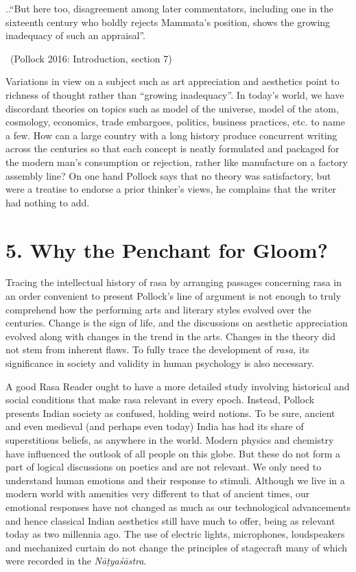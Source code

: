 
\begin{myquote}
..``But here too, disagreement among later commentators, including one in the sixteenth century who boldly rejects Mammata’s position, shows the growing inadequacy of such an appraisal”. 

~\hfill (Pollock 2016: Introduction, section 7)
\end{myquote}

Variations in view on a subject such as art appreciation and aesthetics point to richness of thought rather than “growing inadequacy”. In today’s world, we have discordant theories on topics such as model of the universe, model of the atom, cosmology, economics, trade embargoes, politics, business practices, etc. to name a few. How can a large country with a long history produce concurrent writing across the centuries so that each concept is neatly formulated and packaged for the modern man’s consumption or rejection, rather like manufacture on a factory assembly line? On one hand Pollock says that no theory was satisfactory, but were a treatise to endorse a prior thinker’s views, he complains that the writer had nothing to add.


\section*{5. Why the Penchant for Gloom?}

Tracing the intellectual history of rasa by arranging passages concerning rasa in an order convenient to present Pollock’s line of argument is not enough to truly comprehend how the performing arts and literary styles evolved over the centuries. Change is the sign of life, and the discussions on aesthetic appreciation evolved along with changes in the trend in the arts. Changes in the theory did not stem from inherent flaws. To fully trace the development of \textit{rasa,} its significance in society and validity in human psychology is also necessary.

\eject

A good Rasa Reader ought to have a more detailed study involving historical and social conditions that make rasa relevant in every epoch. Instead, Pollock presents Indian society as confused, holding weird notions. To be sure, ancient and even medieval (and perhaps even today) India has had its share of superstitious beliefs, as anywhere in the world. Modern physics and chemistry have influenced the outlook of all people on this globe. But these do not form a part of logical discussions on poetics and are not relevant. We only need to understand human emotions and their response to stimuli. Although we live in a modern world with amenities very different to that of ancient times, our emotional responses have not changed as much as our technological advancements and hence classical Indian aesthetics still have much to offer, being as relevant today as two millennia ago. The use of electric lights, microphones, loudspeakers and mechanized curtain do not change the principles of stagecraft many of which were recorded in the \textit{Nāṭyaśāstra}.

